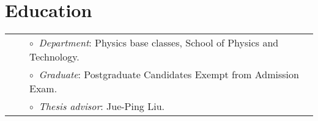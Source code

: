 \documentclass[letterpaper]{moderncv}  %
\begin{document}



\section{Education}



\vspace{0.3cm}
\vspace{-0.1cm}
\begin{tabular}{rcl}
&\hspace{0.4cm} &$\circ\;\;${\textit{Department}}: Physics base classes,  School of Physics and Technology.\\
&\hspace{0.4cm} &$\circ\;\;${\textit{Graduate}}: Postgraduate Candidates Exempt from Admission Exam.\\
&\hspace{0.4cm} &$\circ\;\;${\textit{Thesis advisor}}:  Jue-Ping Liu.\\
\end{tabular}
\end{document}
